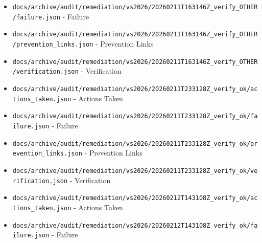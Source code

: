 \documentclass[10.5pt,a4paper,openany]{book}
\begin{document}
\begin{itemize}
\item \texttt{docs/\allowbreak{}archive/\allowbreak{}audit/\allowbreak{}remediation/\allowbreak{}vs2026/\allowbreak{}20260211T163146Z\_\allowbreak{}verify\_\allowbreak{}OTHER/\allowbreak{}failure.\allowbreak{}json} -\allowbreak{} Failure
\item \texttt{docs/\allowbreak{}archive/\allowbreak{}audit/\allowbreak{}remediation/\allowbreak{}vs2026/\allowbreak{}20260211T163146Z\_\allowbreak{}verify\_\allowbreak{}OTHER/\allowbreak{}prevention\_\allowbreak{}links.\allowbreak{}json} -\allowbreak{} Prevention Links
\item \texttt{docs/\allowbreak{}archive/\allowbreak{}audit/\allowbreak{}remediation/\allowbreak{}vs2026/\allowbreak{}20260211T163146Z\_\allowbreak{}verify\_\allowbreak{}OTHER/\allowbreak{}verification.\allowbreak{}json} -\allowbreak{} Verification
\item \texttt{docs/\allowbreak{}archive/\allowbreak{}audit/\allowbreak{}remediation/\allowbreak{}vs2026/\allowbreak{}20260211T233128Z\_\allowbreak{}verify\_\allowbreak{}ok/\allowbreak{}actions\_\allowbreak{}taken.\allowbreak{}json} -\allowbreak{} Actions Taken
\item \texttt{docs/\allowbreak{}archive/\allowbreak{}audit/\allowbreak{}remediation/\allowbreak{}vs2026/\allowbreak{}20260211T233128Z\_\allowbreak{}verify\_\allowbreak{}ok/\allowbreak{}failure.\allowbreak{}json} -\allowbreak{} Failure
\item \texttt{docs/\allowbreak{}archive/\allowbreak{}audit/\allowbreak{}remediation/\allowbreak{}vs2026/\allowbreak{}20260211T233128Z\_\allowbreak{}verify\_\allowbreak{}ok/\allowbreak{}prevention\_\allowbreak{}links.\allowbreak{}json} -\allowbreak{} Prevention Links
\item \texttt{docs/\allowbreak{}archive/\allowbreak{}audit/\allowbreak{}remediation/\allowbreak{}vs2026/\allowbreak{}20260211T233128Z\_\allowbreak{}verify\_\allowbreak{}ok/\allowbreak{}verification.\allowbreak{}json} -\allowbreak{} Verification
\item \texttt{docs/\allowbreak{}archive/\allowbreak{}audit/\allowbreak{}remediation/\allowbreak{}vs2026/\allowbreak{}20260212T143108Z\_\allowbreak{}verify\_\allowbreak{}ok/\allowbreak{}actions\_\allowbreak{}taken.\allowbreak{}json} -\allowbreak{} Actions Taken
\item \texttt{docs/\allowbreak{}archive/\allowbreak{}audit/\allowbreak{}remediation/\allowbreak{}vs2026/\allowbreak{}20260212T143108Z\_\allowbreak{}verify\_\allowbreak{}ok/\allowbreak{}failure.\allowbreak{}json} -\allowbreak{} Failure

\end{itemize}
\end{document}

